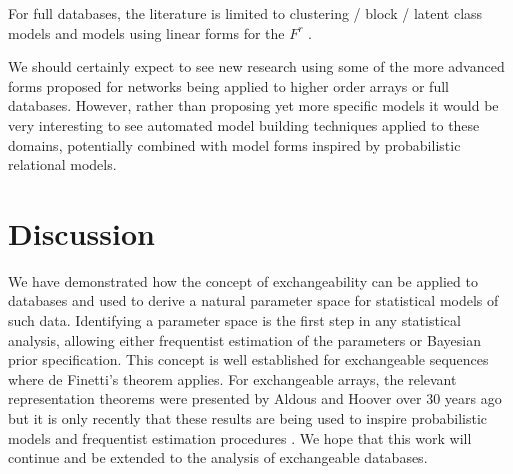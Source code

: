 For full databases, the literature is limited to clustering / block / latent class models \citep{Kemp2006-jt, Xu2006-uy} and models using linear forms for the $F^r$ \citep[e.g.][]{Lippert2008-gg, Singh2008-cb, Singh2008-qw, Jimeng2009-rw, Acar2011-vg, Gao2011-ac, Nickel2011-pi, Acar2012-no, Ermis2012-gk, Shangguan2012-ga, Singh2012-jj, Acar2013-na, Andersen2013-rg, Yin2013-we}.

We should certainly expect to see new research using some of the more advanced forms proposed for networks being applied to higher order arrays or full databases.
However, rather than proposing yet more specific models it would be very interesting to see automated model building techniques applied to these domains, potentially combined with model forms inspired by probabilistic relational models.

\section{Discussion}

We have demonstrated how the concept of exchangeability can be applied to databases and used to derive a natural parameter space for statistical models of such data.
Identifying a parameter space is the first step in any statistical analysis, allowing either frequentist estimation of the parameters or Bayesian prior specification.
This concept is well established for exchangeable sequences where de Finetti's theorem applies.
For exchangeable arrays, the relevant representation theorems were presented by Aldous and Hoover \cite{Aldous1981-lg, Hoover1979-br} over 30 years ago but it is only recently that these results are being used to inspire probabilistic models \cite{Hoff2007-ja, Roy2009-ge, Lloyd2012-sb} and frequentist estimation procedures \cite{Kallenberg1999-pj, Choi2013-th, Wolfe2013-vs}.
We hope that this work will continue and be extended to the analysis of exchangeable databases.



\outbpdocument{


}
